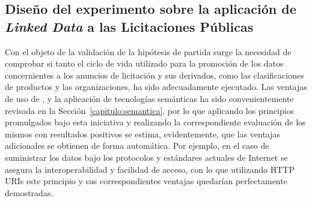 \subsection{Diseño del experimento sobre la aplicación de \textit{Linked Data} a las Licitaciones Públicas}
Con el objeto de la validación de la hipótesis de partida surge la necesidad de comprobar si tanto el ciclo de vida 
utilizado para la promoción de los datos concernientes a los anuncios de licitación y sus derivados, como las 
clasificaciones de productos y las organizaciones, ha sido adecuadamente ejecutado. Las ventajas 
de uso de \linkeddata, \opendata y la aplicación de tecnologías semánticas ha sido convenientemente 
revisada en la Sección~\ref{capitulo:semantica}, por lo que aplicando los principios promulgados bajo 
esta iniciativa y realizando la correspondiente evaluación de los mismos con resultados positivos 
se estima, evidentemente, que las ventajas adicionales se obtienen de forma automática. Por ejemplo, 
en el caso de suministrar los datos bajo los protocolos y estándares actuales de Internet se asegura 
la interoperabilidad y facilidad de acceso, con lo que utilizando \gls{HTTP URI}s este principio y sus correspondientes 
ventajas quedarían perfectamente demostradas.

